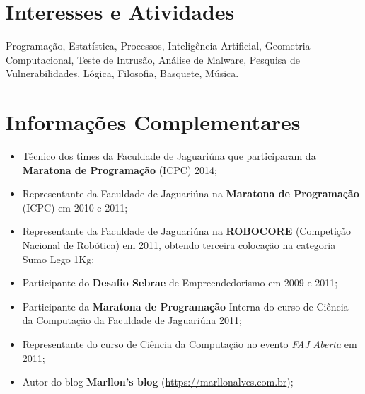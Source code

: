 \documentclass[a4paper,10pt]{article} %
\begin{document}

\section{Interesses e Atividades}

Programação, Estatística, Processos, Inteligência Artificial, Geometria Computacional, Teste de Intrusão, Análise de Malware, Pesquisa de Vulnerabilidades, Lógica,  Filosofia, Basquete, Música. %



\section{Informações Complementares}

\begin{itemize}
  \item Técnico dos times da Faculdade de Jaguariúna que participaram da \textbf{Maratona de Programação} (ICPC) 2014;  
  \item Representante da Faculdade de Jaguariúna na \textbf{Maratona de Programação} (ICPC) em 2010 e 2011;  

  \item Representante da Faculdade de Jaguariúna na \textbf{ROBOCORE} (Competição Nacional de Robótica) em 2011, obtendo terceira colocação na categoria Sumo Lego 1Kg;
  \item Participante do \textbf{Desafio Sebrae} de Empreendedorismo em 2009 e 2011;
  \item Participante da \textbf{Maratona de Programação} Interna do curso de Ciência da Computação da Faculdade de Jaguariúna 2011;
  \item Representante do curso de Ciência da Computação no evento \emph{FAJ Aberta} em 2011;
  \item Autor do blog \textbf{Marllon's blog} (\url{https://marllonalves.com.br});
  {\fb}\setmainfont[SmallCapsFont=Fontin SmallCaps]{Fontin-Regular}\\
\end{itemize}

\end{document}
